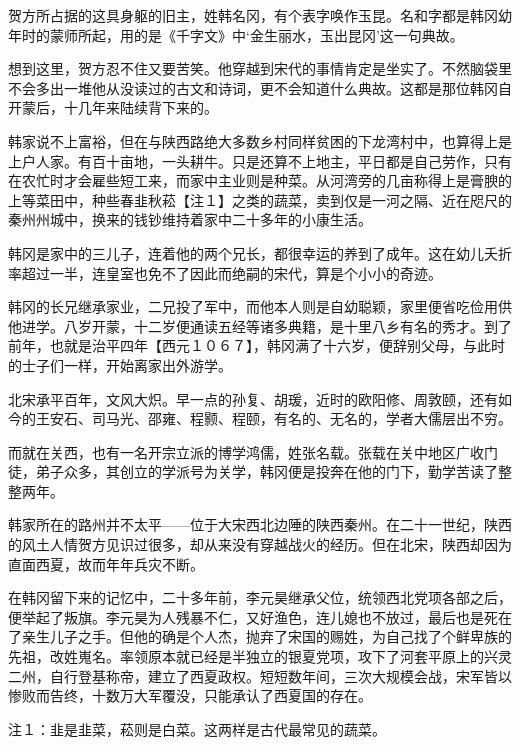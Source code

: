 贺方所占据的这具身躯的旧主，姓韩名冈，有个表字唤作玉昆。名和字都是韩冈幼年时的蒙师所起，用的是《千字文》中‘金生丽水，玉出昆冈’这一句典故。

想到这里，贺方忍不住又要苦笑。他穿越到宋代的事情肯定是坐实了。不然脑袋里不会多出一堆他从没读过的古文和诗词，更不会知道什么典故。这都是那位韩冈自开蒙后，十几年来陆续背下来的。

韩家说不上富裕，但在与陕西路绝大多数乡村同样贫困的下龙湾村中，也算得上是上户人家。有百十亩地，一头耕牛。只是还算不上地主，平日都是自己劳作，只有在农忙时才会雇些短工来，而家中主业则是种菜。从河湾旁的几亩称得上是膏腴的上等菜田中，种些春韭秋菘【注１】之类的蔬菜，卖到仅是一河之隔、近在咫尺的秦州州城中，换来的钱钞维持着家中二十多年的小康生活。

韩冈是家中的三儿子，连着他的两个兄长，都很幸运的养到了成年。这在幼儿夭折率超过一半，连皇室也免不了因此而绝嗣的宋代，算是个小小的奇迹。

韩冈的长兄继承家业，二兄投了军中，而他本人则是自幼聪颖，家里便省吃俭用供他进学。八岁开蒙，十二岁便通读五经等诸多典籍，是十里八乡有名的秀才。到了前年，也就是治平四年【西元１０６７】，韩冈满了十六岁，便辞别父母，与此时的士子们一样，开始离家出外游学。

北宋承平百年，文风大炽。早一点的孙复、胡瑗，近时的欧阳修、周敦颐，还有如今的王安石、司马光、邵雍、程颢、程颐，有名的、无名的，学者大儒层出不穷。

而就在关西，也有一名开宗立派的博学鸿儒，姓张名载。张载在关中地区广收门徒，弟子众多，其创立的学派号为关学，韩冈便是投奔在他的门下，勤学苦读了整整两年。

韩家所在的路州并不太平——位于大宋西北边陲的陕西秦州。在二十一世纪，陕西的风土人情贺方见识过很多，却从来没有穿越战火的经历。但在北宋，陕西却因为直面西夏，故而年年兵灾不断。

在韩冈留下来的记忆中，二十多年前，李元昊继承父位，统领西北党项各部之后，便举起了叛旗。李元昊为人残暴不仁，又好渔色，连儿媳也不放过，最后也是死在了亲生儿子之手。但他的确是个人杰，抛弃了宋国的赐姓，为自己找了个鲜卑族的先祖，改姓嵬名。率领原本就已经是半独立的银夏党项，攻下了河套平原上的兴灵二州，自行登基称帝，建立了西夏政权。短短数年间，三次大规模会战，宋军皆以惨败而告终，十数万大军覆没，只能承认了西夏国的存在。

注１：韭是韭菜，菘则是白菜。这两样是古代最常见的蔬菜。